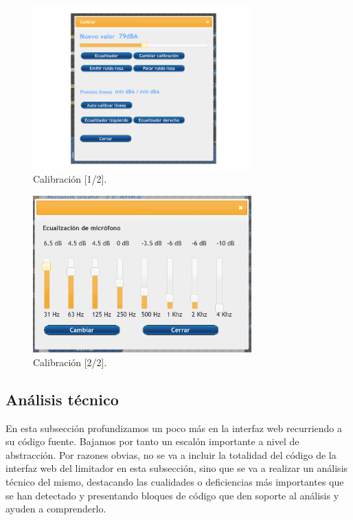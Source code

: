 \begin{figure}[ht]
    \centering
    \includegraphics[width=0.75\textwidth]{imagenes/interfaz/Interfaz_7_calibrar_0.png}
    \caption{Calibración [1/2].}
	\label{img:lms7-calibrate}
\end{figure}

\begin{figure}[ht]
    \centering
    \includegraphics[width=0.75\textwidth]{imagenes/interfaz/Interfaz_7_calibrar_1.png}
    \caption{Calibración [2/2].}
\end{figure}

\clearpage
\subsection{Análisis técnico}

En esta subsección profundizamos un poco más en la interfaz web recurriendo a su código fuente. Bajamos por tanto un escalón importante a nivel de abstracción. Por razones obvias, no se va a incluir la totalidad del código de la interfaz web del limitador en esta subsección, sino que se va a realizar un análisis técnico del mismo, destacando las cualidades o deficiencias más importantes que se han detectado y presentando bloques de código que den soporte al análisis y ayuden a comprenderlo.

